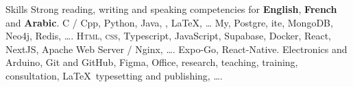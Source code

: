 
\begin{rubric}{Skills}
    \entry*[Languages]
    Strong reading, writing and speaking competencies for \textbf{English}, \textbf{French} and \textbf{Arabic}.
    C / Cpp, Python, Java, , \LaTeX, \ldots
    \entry*[Databases]
    My, Postgre, ite, MongoDB, Neo4j, Redis, \ldots.
    \textsc{Html, css}, Typescript, JavaScript, Supabase, Docker, React, NextJS, Apache Web Server / Nginx, \ldots.
    Expo-Go, React-Native.
    \entry*[Misc.]
    Electronics and Arduino, Git and GitHub, Figma, Office, research, teaching, training, consultation, \LaTeX\ typesetting and publishing, \ldots.
\end{rubric}

